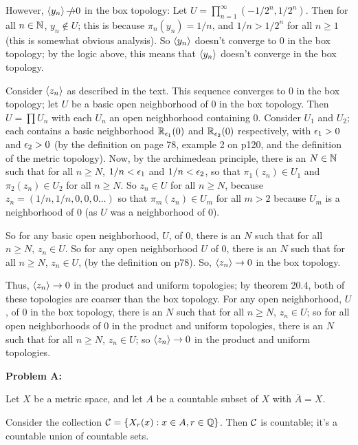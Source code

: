 \documentclass[a4paper,12pt]{article}
\begin{document}
However, $\left\langle y_n \right\rangle \slashed{\to} 0$ in the box topology: Let $U = \prod\limits_{n=1}^\infty (-1/2^n,1/2^n)$. Then for all $n \in \mathbb{N}$, $y_n \notin U$; this is because $\pi_n(y_n) = 1/n$, and $1/n > 1/2^n$ for all $n \geq 1$ (this is somewhat obvious analysis). So $\left\langle y_n \right\rangle$ doesn't converge to $0$ in the box topology; by the logic above, this means that $\left\langle y_n \right\rangle$ doesn't converge in the box topology.

Consider $\left\langle z_n \right\rangle$ as described in the text. This sequence converges to $0$ in the box topology; let $U$ be a basic open neighborhood of $0$ in the box topology. Then $U = \prod U_n$ with each $U_n$ an open neighborhood containing $0$. Consider $U_1$ and $U_2$; each contains a basic neighborhood $\mathbb{R}_{\epsilon_1}(0)$ and $\mathbb{R}_{\epsilon_2}(0)$ respectively, with $\epsilon_1 >0$ and $\epsilon_2 >0$  (by the definition on page 78, example 2 on p120, and the definition of the metric topology). Now, by the archimedean principle, there is an $N \in \mathbb{N}$ such that for all $n \geq N$,  $1/n < \epsilon_1$ and $1/n < \epsilon_2$, so that $\pi_1(z_n) \in U_1$ and $\pi_2(z_n) \in U_2$ for all $n \geq N$. So $z_n \in U$ for all $n \geq N$, because $z_n = (1/n,1/n,0,0,0\ldots)$ so that $\pi_m(z_n) \in U_m$ for all $m > 2$ because $U_m$ is a neighborhood of $0$ (as $U$ was a neighborhood of $0$).

So for any basic open neighborhood, $U$, of $0$, there is an $N$ such that for all $n \geq N$, $z_n \in U$. So for any open neighborhood $U$ of $0$, there is an $N$ such that for all $n \geq N$, $z_n \in U$, (by the definition on p78). So, $\left\langle z_n \right\rangle \to 0$ in the box topology.

Thus, $\left\langle z_n \right\rangle \to 0$ in the product and uniform topologies; by theorem 20.4, both of these topologies are coarser than the box topology. For any open neighborhood, $U$, of $0$ in the box topology, there is an $N$ such that for  all $n \geq N$, $z_n \in U$; so for all open neighborhoods of $0$ in the product and uniform topologies, there is an $N$ such that for  all $n \geq N$, $z_n \in U$; so $\left\langle z_n \right\rangle \to 0$ in the product and uniform topologies.


\shunt

{\bf Problem A:}

Let $X$ be a metric space, and let $A$ be a countable subset of $X$ with $\overline{A} = X$.

Consider the collection $\mathcal{C} = \{X_r(x): x \in A, r \in \mathbb{Q}\}$. Then $\mathcal{C}$ is countable; it's a countable union of countable sets.
\end{document}
